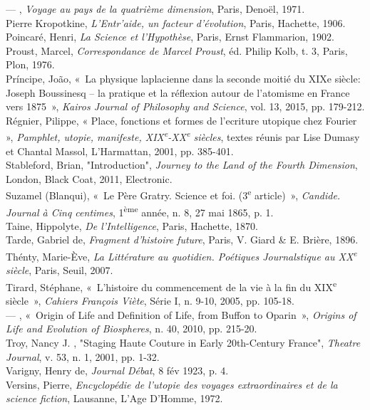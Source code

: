 --- , \emph{Voyage au pays de la quatrième dimension}, Paris, Denoël, 1971.\\
Pierre Kropotkine, \emph{L'Entr'aide, un facteur d'évolution}, Paris, Hachette, 1906.\\
Poincaré, Henri, \emph{La Science et l'Hypothèse}, Paris, Ernst Flammarion, 1902.\\
Proust, Marcel, \emph{Correspondance de Marcel Proust}, éd. Philip Kolb, t. 3, Paris, Plon, 1976.\\
Príncipe, João, «~La physique laplacienne dans la seconde moitié du XIXe siècle: Joseph Boussinesq – la pratique et la réflexion autour de l’atomisme en France vers 1875~», \emph{Kairos Journal of Philosophy and Science}, vol. 13, 2015, pp. 179-212.\\
Régnier, Pilippe, « Place, fonctions et formes de l'ecriture utopique chez Fourier », \emph{Pamphlet, utopie, manifeste, XIX\textsuperscript{e}-XX\textsuperscript{e} siècles}, textes réunis par Lise Dumasy et Chantal Massol, L'Harmattan, 2001, pp. 385-401.\\
Stableford, Brian, "Introduction", \emph{Journey to the Land of the Fourth Dimension},  London, Black Coat, 2011, Electronic.\\
Suzamel (Blanqui), «~Le Père Gratry. Science et foi. (3\textsuperscript{e} article)~», \emph{Candide. Journal à Cinq centimes}, 1\textsuperscript{ème} année, n. 8, 27 mai 1865, p. 1.\\
Taine, Hippolyte, \emph{De l'Intelligence}, Paris, Hachette, 1870.\\
Tarde, Gabriel de, \emph{Fragment d'histoire future}, Paris, V. Giard \& E. Brière, 1896.\\
Thénty, Marie-Ève, \emph{La Littérature au quotidien. Poétiques Journalstique au XX\textsuperscript{e} siècle}, Paris, Seuil, 2007.\\
Tirard, Stéphane, «~L’histoire du commencement de la vie à la fin du XIX\textsuperscript{e} siècle~», \emph{Cahiers François Viète}, Série I, n. 9-10, 2005, pp. 105-18.\\
--- , «~Origin of Life and Definition of Life, from Buffon to Oparin~», \emph{Origins of Life and Evolution of Biospheres}, n. 40, 2010, pp. 215-20.\\
Troy, Nancy J. , "Staging Haute Couture in Early 20th-Century France", \emph{Theatre Journal}, v. 53, n. 1, 2001, pp. 1-32.\\
Varigny, Henry de, \emph{Journal Débat}, 8 fév 1923, p. 4.\\%
Versins, Pierre, \emph{Encyclopédie de l'utopie des voyages extraordinaires et de la science fiction}, Lausanne, L'Age D'Homme, 1972.\\
